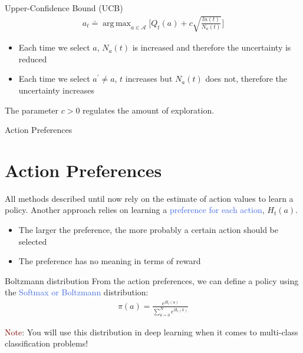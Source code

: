 \documentclass{beamer}
\DeclareMathOperator*{\argmax}{arg\,max}
\begin{document}
\begin{frame}{Upper-Confidence Bound (UCB)}
\begin{align*}
a_t \doteq \argmax_{a \in \mathcal{A}} \bigg [ Q_t(a) + c \sqrt{\frac{ln(t)}{N_a(t)}} \bigg ]
\end{align*}

\hspace{3mm}

\begin{itemize}
    \item Each time we select $a$, $N_a(t)$ is increased and therefore the uncertainty is reduced
    \item Each time we select $a^{\prime} \neq a$, $t$ increases but $N_a(t)$ does not, therefore the uncertainty increases
\end{itemize}

\hspace{2mm}

The parameter $c > 0$ regulates the amount of exploration.

\end{frame}


\begin{frame}{Action Preferences}
\section{Action Preferences}

All methods described until now rely on the estimate of action values to learn a policy.
Another approach relies on learning a \textcolor{RoyalBlue}{preference for each action}, $H_t(a)$.

\vspace{1mm}

\begin{itemize}
    \item The larger the preference, the more probably a certain action should be selected
    \item The preference has no meaning in terms of reward
\end{itemize}

\vspace{1mm}

\begin{block}{Boltzmann distribution}
From the action preferences, we can define a policy using the \textcolor{RoyalBlue}{Softmax or Boltzmann} distribution:
\begin{align*}
    \pi(a) = \frac{e^{H_t(a)}}{\sum_{k=0}^{N} e^{H_t(k)}}
    \end{align*}
\end{block}

\textcolor{Maroon}{Note}: You will use this distribution in deep learning when it comes to multi-class classification problems!

\end{frame}
\end{document}
